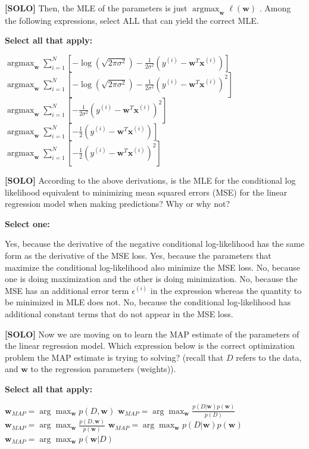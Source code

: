 \documentclass[11pt,addpoints,answers]{exam}
\newcommand \argmax {\operatorname*{argmax}}
\newcommand{\solo}{\textbf{[SOLO]} }
\begin{document}
\begin{questions}
    
    \question[3] \solo Then, the MLE of the parameters is just  $\argmax_{\mathbf{w}} \ell(\mathbf{w})$ . Among the following expressions, select ALL that can yield the correct MLE. 

    \textbf{Select all that apply:}
    {\checkboxchar{$\Box$} \checkedchar{$\blacksquare$}
    \begin{checkboxes}
        \choice $\argmax_{\mathbf{w}} \sum_{i=1}^{N} [-\log (\sqrt{2\pi\sigma^2}) - \frac{1}{2\sigma^2} (y^{(i)} - \mathbf{w}^T\mathbf{x}^{(i)})]$
        \choice $\argmax_{\mathbf{w}} \sum_{i=1}^{N} [-\log (\sqrt{2\pi\sigma^2}) - \frac{1}{2\sigma^2} (y^{(i)} - \mathbf{w}^T\mathbf{x}^{(i)})^2]$
        \choice $\argmax_{\mathbf{w}} \sum_{i=1}^{N} [- \frac{1}{2\sigma^2} (y^{(i)} - \mathbf{w}^T\mathbf{x}^{(i)})^2]$
        \choice $\argmax_{\mathbf{w}} \sum_{i=1}^{N} [- \frac{1}{2} (y^{(i)} - \mathbf{w}^T\mathbf{x}^{(i)})]$
        \choice $\argmax_{\mathbf{w}} \sum_{i=1}^{N} [- \frac{1}{2} (y^{(i)} - \mathbf{w}^T\mathbf{x}^{(i)})^2]$
    \end{checkboxes}
    }
    
    
    \question[3] \solo According to the above derivations, is the MLE for the conditional log likelihood equivalent to minimizing mean squared errors (MSE) for the linear regression model when making predictions? Why or why not? 

    \textbf{Select one:}
    \begin{checkboxes}
        \choice Yes, because the derivative of the negative conditional log-likelihood has the same form as the derivative of the MSE loss. 
        \choice Yes, because the parameters that maximize the conditional log-likelihood also minimize the MSE loss.
        \choice No, because one is doing maximization and the other is doing minimization.
        \choice No, because the MSE has an additional error term $\epsilon^{(i)}$ in the expression whereas the quantity to be minimized in MLE does not. 
        \choice No, because the conditional log-likelihood has additional constant terms that do not appear in the MSE loss.
    \end{checkboxes}
    
    \question[3]\solo Now we are moving on to learn the MAP estimate of the parameters of the linear regression model. Which expression below is the correct optimization problem the MAP estimate is trying to solving? (recall that $D$ refers to the data, and $\mathbf{w}$ to the regression parameters (weights)).
    
    
    \textbf{Select all that apply:}
    {\checkboxchar{$\Box$} \checkedchar{$\blacksquare$}
    \begin{checkboxes}
        \choice $\mathbf{w}_{MAP} = \arg\max_{\mathbf{w}} p(D, \mathbf{w})$
        \choice $\mathbf{w}_{MAP} = \arg\max_{\mathbf{w}} \frac{p(D| \mathbf{w})p(\mathbf{w})}{p(D)}$
        \choice $\mathbf{w}_{MAP} = \arg\max_{\mathbf{w}} \frac{p(D, \mathbf{w})}{p(\mathbf{w})}$
        \choice $\mathbf{w}_{MAP} = \arg\max_{\mathbf{w}} p(D| \mathbf{w})p(\mathbf{w})$
        \choice $\mathbf{w}_{MAP} = \arg\max_{\mathbf{w}} p(\mathbf{w}| D)$
    \end{checkboxes}
    }
    

\end{questions}
\end{document}
